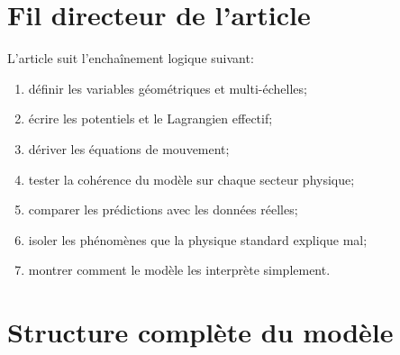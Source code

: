 \documentclass[11pt,a4paper]{article}
\begin{document}
\section{Fil directeur de l'article}
L'article suit l'enchaînement logique suivant:
\begin{enumerate}
	\item définir les variables géométriques et multi-échelles;
	\item écrire les potentiels et le Lagrangien effectif;
	\item dériver les équations de mouvement;
	\item tester la cohérence du modèle sur chaque secteur physique;
	\item comparer les prédictions avec les données réelles;
	\item isoler les phénomènes que la physique standard explique mal;
	\item montrer comment le modèle les interprète simplement.
\end{enumerate}

\section{Structure complète du modèle}
\end{document}
